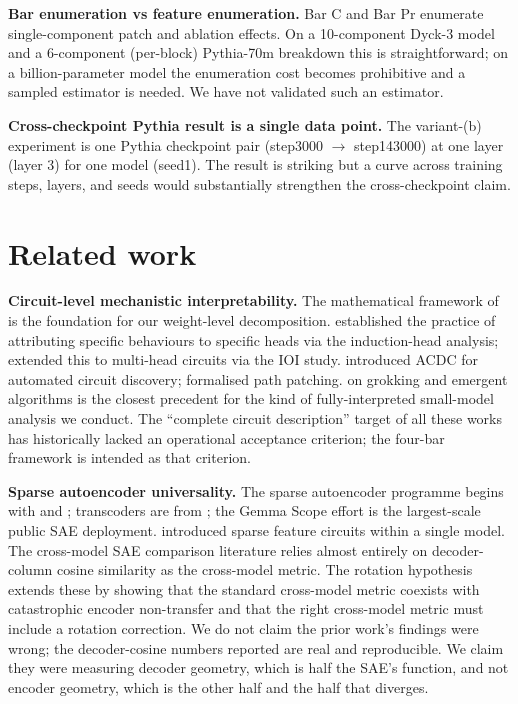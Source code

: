 \documentclass[11pt,letterpaper]{article}
\begin{document}
\textbf{Bar enumeration vs feature enumeration.} Bar C and Bar Pr enumerate single-component patch and ablation effects. On a 10-component Dyck-3 model and a 6-component (per-block) Pythia-70m breakdown this is straightforward; on a billion-parameter model the enumeration cost becomes prohibitive and a sampled estimator is needed. We have not validated such an estimator.

\textbf{Cross-checkpoint Pythia result is a single data point.} The variant-(b) experiment is one Pythia checkpoint pair (step3000 $\to$ step143000) at one layer (layer 3) for one model (seed1). The result is striking but a curve across training steps, layers, and seeds would substantially strengthen the cross-checkpoint claim.

\section{Related work}
\label{sec:related}

\textbf{Circuit-level mechanistic interpretability.} The mathematical framework of \citet{elhage2021mathematical} is the foundation for our weight-level decomposition. \citet{olsson2022incontext} established the practice of attributing specific behaviours to specific heads via the induction-head analysis; \citet{wang2022ioi} extended this to multi-head circuits via the IOI study. \citet{conmy2023acdc} introduced ACDC for automated circuit discovery; \citet{goldowskydill2023localizing} formalised path patching. \citet{nanda2023progress} on grokking and emergent algorithms is the closest precedent for the kind of fully-interpreted small-model analysis we conduct. The ``complete circuit description'' target of all these works has historically lacked an operational acceptance criterion; the four-bar framework is intended as that criterion.

\textbf{Sparse autoencoder universality.} The sparse autoencoder programme begins with \citet{cunningham2023sparse} and \citet{bricken2023monosemanticity}; transcoders are from \citet{dunefsky2024transcoders}; the Gemma Scope effort \citep{lieberum2024gemma} is the largest-scale public SAE deployment. \citet{marks2024sparse} introduced sparse feature circuits within a single model. The cross-model SAE comparison literature \citep{lan2024sparse,templeton2024scaling,lieberum2024gemma} relies almost entirely on decoder-column cosine similarity as the cross-model metric. The rotation hypothesis extends these by showing that the standard cross-model metric coexists with catastrophic encoder non-transfer and that the right cross-model metric must include a rotation correction. We do not claim the prior work's findings were wrong; the decoder-cosine numbers reported are real and reproducible. We claim they were measuring decoder geometry, which is half the SAE's function, and not encoder geometry, which is the other half and the half that diverges.
\end{document}
